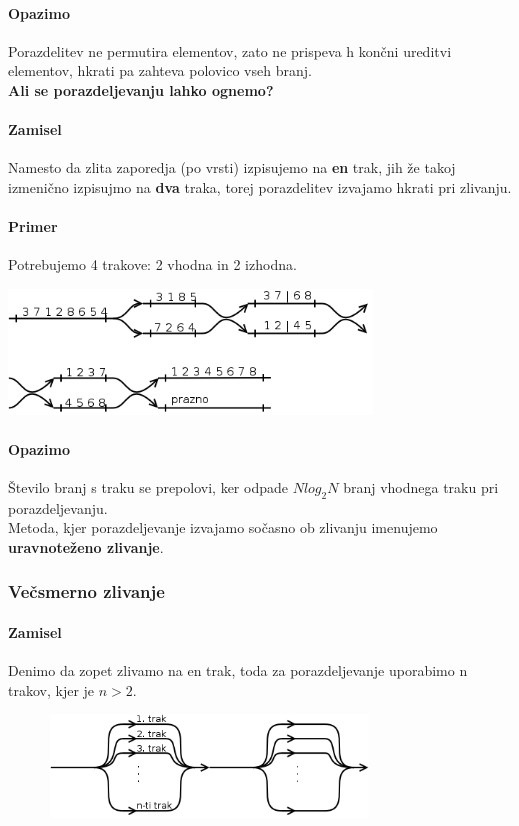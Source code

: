 \documentclass[a4paper,10pt]{article}
\begin{document}
\paragraph{Opazimo}
Porazdelitev ne permutira elementov, zato ne prispeva h kon\v cni ureditvi elementov, hkrati pa zahteva polovico vseh branj.\\
\textbf{Ali se porazdeljevanju lahko ognemo?}

\paragraph{Zamisel}
Namesto da zlita zaporedja (po vrsti) izpisujemo na \textbf{en} trak, jih \v ze takoj izmeni\v cno izpisujmo na \textbf{dva} traka, torej porazdelitev izvajamo hkrati pri zlivanju.

\paragraph{Primer}
Potrebujemo 4 trakove: 2 vhodna in 2 izhodna.
\begin{center}
	\includegraphics[width=9.65cm,height=3.35cm]{Slike/UravnotezenoZlivanjePrimer.png}
\end{center}

\paragraph{Opazimo}
\v Stevilo branj s traku se prepolovi, ker odpade $Nlog_2N$ branj vhodnega traku pri porazdeljevanju.\\
Metoda, kjer porazdeljevanje izvajamo so\v casno ob zlivanju imenujemo \textbf{uravnote\v zeno zlivanje}.

\subsubsection{Ve\v csmerno zlivanje}

\paragraph{Zamisel}
Denimo da zopet zlivamo na en trak, toda za porazdeljevanje uporabimo n trakov, kjer je $n > 2$.
\begin{center}
	\includegraphics[width=10.65cm,height=2.75cm]{Slike/VecsmernoZlivanjeZamisel.png}
\end{center}
\end{document}

